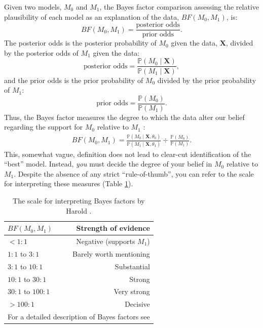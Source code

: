 Given two models, $M_0$ and $M_1$, the Bayes factor comparison assessing the relative plausibility of each model as an explanation of the data, $BF(M_0,M_1)$, is:
$$BF(M_0,M_1) = \frac{\mbox{posterior odds}}{\mbox{prior odds}}.$$
The posterior odds is the posterior probability of $M_0$ given the data, $\mathbf X$, divided by the posterior odds of $M_1$ given the data:
$$\mbox{posterior odds} = \frac{\mathbb{P}(M_0 \mid \mathbf X)}{\mathbb{P}(M_1 \mid \mathbf X)},$$
and the prior odds is the prior probability of $M_0$ divided by the prior probability of $M_1$:
$$\mbox{prior odds} = \frac{\mathbb{P}(M_0)}{\mathbb{P}(M_1)}.$$
Thus, the Bayes factor measures the degree to which the data alter our belief regarding the support for $M_0$ relative to $M_1$ \citep{lavine99}:
\begin{align}\label{BFeq1}
BF(M_0,M_1) = \frac{\mathbb{P}(M_0 \mid \mathbf X, \theta_0)}{\mathbb{P}(M_1 \mid \mathbf X, \theta_1)} \div \frac{\mathbb{P}(M_0)}{\mathbb{P}(M_1)}. 
\end{align}
This, somewhat vague, definition does not lead to clear-cut identification of the ``best'' model. Instead, \textsl{you} must decide the degree of your belief in $M_0$ relative to $M_1$. 
Despite the absence of any strict ``rule-of-thumb'', you can refer to the scale \citep[outlined by][]{jeffreys61} for interpreting these measures (Table \ref{bftable}).
\begin{table}[h]
\centering
\caption{\small The scale for interpreting Bayes factors by Harold \citet{jeffreys61}.} 
\label{bftable}
\begin{tabular}{l c r}
\hline
\multicolumn{1}{l}{\textbf{$BF(M_0, M_1)$}} & \multicolumn{1}{r}{ } &\multicolumn{1}{r}{{Strength of evidence}} \\ 
\hline
$<1:1$ & \hspace{8mm} & Negative (supports $M_1$)\\
$1:1$ to $3:1$ & & Barely worth mentioning\\
$3:1$ to $10:1$ & & Substantial\\
$10:1$ to $30:1$ & & Strong\\
$30:1$ to $100:1$ & & Very strong\\
$>100:1$ & & Decisive\\
\hline
\multicolumn{3}{l}{{\scriptsize{For a detailed description of Bayes factors see \citet{kass95}}}} 
\end{tabular}
\end{table}


